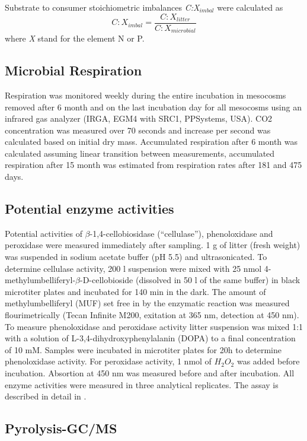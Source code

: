 Substrate to consumer stoichiometric imbalances \emph{C:X$_{imbal}$} were calculated as
\begin{equation}
 C:X_{imbal}=\frac{C:X_{litter}}{C:X_{microbial}} \label{eq:imbal}
\end{equation}
where \emph{X} stand for the element N or P.

\subsection*{Microbial Respiration}
Respiration was monitored weekly during the entire incubation in mesocosms removed after 6 month and on the last incubation day for all mesocosms using an infrared gas analyzer (IRGA, EGM4 with SRC1, PPSystems, USA). CO2 concentration was measured over 70 seconds and increase per second was calculated based on initial dry mass. Accumulated respiration after 6 month was calculated assuming linear transition between measurements, accumulated respiration after 15 month was estimated from respiration rates after 181 and 475 days.

\subsection*{Potential enzyme activities}

Potential activities of $\beta$-1,4-cellobiosidase (``cellulase''), phenoloxidase and peroxidase were measured immediately after sampling. 1 g of litter (fresh weight) was suspended in sodium acetate buffer (pH 5.5) and ultrasonicated. To determine cellulase activity, 200 \textmu l suspension were mixed with 25 nmol 4-methylumbelliferyl-$\beta$-D-cellobioside (dissolved in 50 \textmu l of the same buffer) in black microtiter plates and incubated for 140 min in the dark. The amount of methylumbelliferyl (MUF) set free in by the enzymatic reaction was measured flourimetrically (Tecan Infinite M200, exitation at 365 nm, detection at 450 nm). To measure phenoloxidase and peroxidase activity litter suspension was mixed 1:1 with a solution of L-3,4-dihydroxyphenylalanin (DOPA) to a final concentration of 10 mM. Samples were incubated in microtiter plates for 20h to determine phenoloxidase activity. For peroxidase activity, 1 nmol of $H_2O_2$ was added before incubation. Absortion at 450 nm was measured before and 
after incubation. All enzyme activities were measured in three analytical replicates. The assay is described in detail in \cite{Kaiser2010b}.

\subsection*{Pyrolysis-GC/MS}

